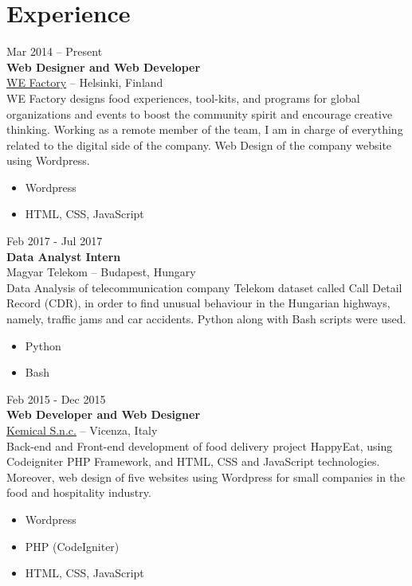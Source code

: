 \documentclass[]{friggeri-cv}
\begin{document}

\section{Experience}

{Mar 2014 -- Present} \\
{\textbf{Web Designer and Web Developer}} \\
{\href{httpz://www.we-factory.co}{WE Factory}} -- Helsinki, Finland \\
{WE Factory designs food experiences, tool-kits, and programs for global organizations and events to boost the community spirit and encourage creative thinking. Working as a remote member of the team, I am in charge of everything related to the digital side of the company. Web Design of the company website using Wordpress.}
\begin{itemize}[noitemsep]
\item Wordpress
\item HTML, CSS, JavaScript \newline
\end{itemize}

{Feb 2017 - Jul 2017} \\
{\textbf{Data Analyst Intern}} \\
Magyar Telekom -- 
Budapest, Hungary \\
{Data Analysis of telecommunication company Telekom dataset called Call Detail Record (CDR), in order to find unusual behaviour in the Hungarian highways, namely, traffic jams and car accidents. Python along with Bash scripts were used.}
\begin{itemize}[noitemsep]
\item Python
\item Bash \newline
\end{itemize}

{Feb 2015 - Dec 2015} \\
{\textbf{Web Developer and Web Designer}} \\
{\href{http://www.kemical.it}{Kemical S.n.c.}} -- {Vicenza, Italy} \\
{Back-end and Front-end development of food delivery project HappyEat, using Codeigniter PHP Framework, and HTML, CSS and JavaScript technologies. Moreover, web design of five websites using Wordpress for small companies in the food and hospitality industry.}
\begin{itemize}[noitemsep]
\item Wordpress
\item PHP (CodeIgniter)
\item HTML, CSS, JavaScript \newline
\end{itemize}
\end{document}
